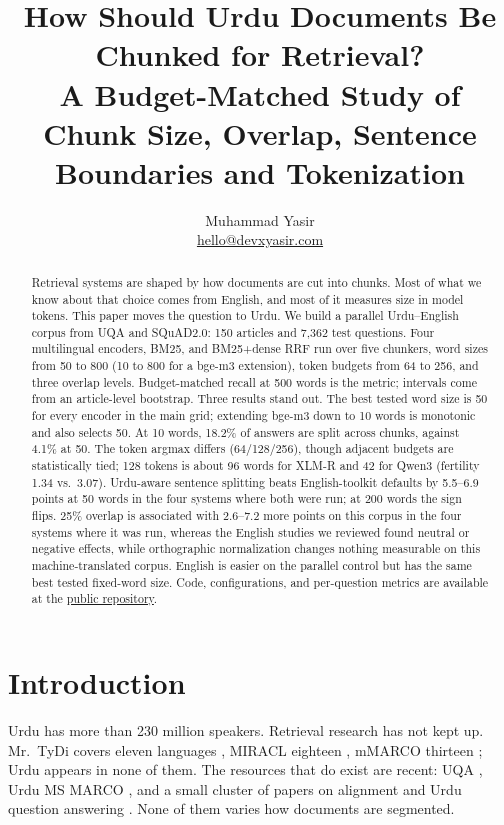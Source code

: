 \documentclass[11pt]{article}
\title{How Should Urdu Documents Be Chunked for Retrieval?\\
A Budget-Matched Study of Chunk Size, Overlap, Sentence Boundaries and Tokenization}
\author{Muhammad Yasir\\\href{mailto:hello@devxyasir.com}{hello@devxyasir.com}}
\begin{document}
\maketitle

\begin{abstract}
Retrieval systems are shaped by how documents are cut into chunks. Most of what we know about
that choice comes from English, and most of it measures size in model tokens. This paper moves the
question to Urdu. We build a parallel Urdu--English corpus from UQA and SQuAD2.0: 150 articles and
7{,}362 test questions. Four multilingual encoders, BM25, and BM25+dense RRF run over five chunkers,
word sizes from 50 to 800 (10 to 800 for a bge-m3 extension), token budgets from 64 to 256, and
three overlap levels. Budget-matched recall at 500 words is the metric; intervals come from an
article-level bootstrap. Three results stand out. The best tested word size is 50 for every encoder
in the main grid; extending bge-m3 down to 10 words is monotonic and also selects 50. At 10 words,
18.2\% of answers are split across chunks, against 4.1\% at 50. The token argmax differs
(64/128/256), though adjacent
budgets are statistically tied;
128 tokens is about 96 words for XLM-R and 42 for Qwen3 (fertility 1.34 vs.\ 3.07). Urdu-aware
sentence splitting beats English-toolkit defaults by 5.5--6.9 points at 50 words in the four systems
where both were run; at 200 words the sign flips. 25\% overlap is associated with 2.6--7.2 more
points on this corpus in the four systems where it was run, whereas the English studies we reviewed
found neutral or negative effects, while orthographic normalization changes nothing measurable on
this machine-translated corpus. English is easier on the parallel control but
has the same best tested fixed-word size. Code, configurations, and per-question metrics are
available at the \href{https://github.com/devxyasir/urdu-chunking-strategy}{public repository}.
\end{abstract}

\section{Introduction}

Urdu has more than 230 million speakers. Retrieval research has not kept up. Mr.\ TyDi covers
eleven languages \citep{zhang2021mr}, MIRACL eighteen \citep{zhang2022making}, mMARCO thirteen
\citep{bonifacio2021mmarco}; Urdu appears in none of them. The resources that do exist are recent:
UQA \citep{arif2024uqa}, Urdu MS MARCO \citep{butt2024enabling}, and a small cluster of papers on
alignment and Urdu question answering \citep{faheem-etal-2026-beyond,ahmad-etal-2026-drrag}. None of
them varies how documents are segmented.
\end{document}
